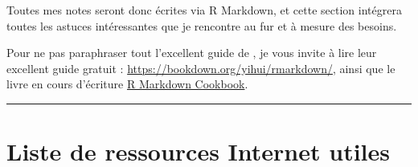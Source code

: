 \documentclass[
  french,
]{book}
\begin{document}
Toutes mes notes seront donc écrites via R Markdown, et cette section intégrera
toutes les astuces intéressantes que je rencontre au fur et à mesure des
besoins.

Pour ne pas paraphraser tout l'excellent guide de \citet{rmarkdown2018}, je vous invite à
lire leur excellent guide gratuit : \url{https://bookdown.org/yihui/rmarkdown/},
ainsi que le livre en cours d'écriture
\href{https://bookdown.org/yihui/rmarkdown-cookbook/}{R Markdown Cookbook}.

\begin{center}\rule{0.5\linewidth}{0.5pt}\end{center}

\hypertarget{ref-rmd}{%
\section*{Liste de ressources Internet utiles}\label{ref-rmd}}
\end{document}
